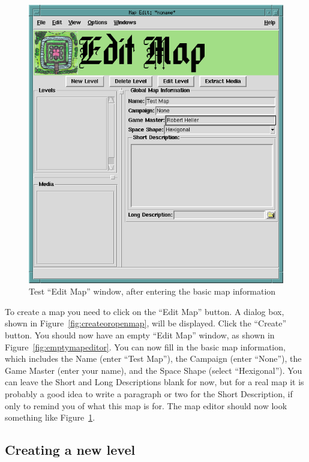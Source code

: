 \begin{figure}[hbpt]
\begin{centering}
\includegraphics[width=5in]{TestMapEditorWindow1.png}
\caption{Test ``Edit Map'' window, after entering the basic map information}
\label{fig:testmapeditor1}
\end{centering}
\end{figure}
To create a map you need to click on the ``Edit Map'' button.  A dialog
box, shown in Figure~\ref{fig:createoropenmap}, will be displayed. 
Click the ``Create'' button.  You should now have an empty ``Edit Map''
window, as shown in Figure~\ref{fig:emptymapeditor}.  You can now fill
in the basic map information, which includes the Name (enter ``Test
Map''), the Campaign (enter ``None''), the Game Master (enter your
name), and the Space Shape (select ``Hexigonal'').  You can leave the
Short and Long Descriptions blank for now, but for a real map it is
probably a good idea to write a paragraph or two for the Short
Description, if only to remind you of what this map is for. The map
editor should now look something like Figure~\ref{fig:testmapeditor1}.

\subsection{Creating a new level}

